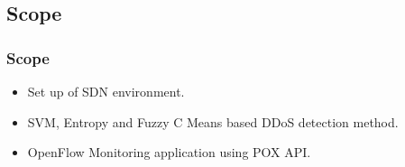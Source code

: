 \documentclass[10pt]{beamer}
\begin{document}
\begin{frame}
\section[]{Scope}
\frametitle{Scope}
\begin{center}
\begin{itemize}
\footnotesize
\item
Set up of SDN environment.
\item
SVM, Entropy and Fuzzy C Means based DDoS detection method.
\item
OpenFlow Monitoring application using POX API.
\end{itemize}
\end{center}
\end{frame}











\end{document}
